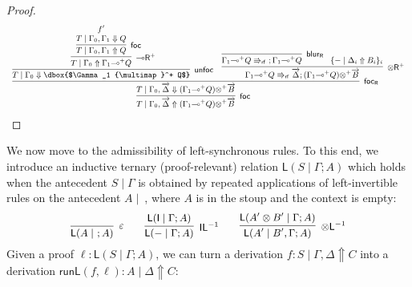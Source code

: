 \documentclass[runningheads]{llncs}
\renewcommand{\vec}{\overrightarrow}
\newcommand{\tl}{\otimes \mathsf{L}}
\newcommand{\tr}{\otimes \mathsf{R}}
\newcommand{\lright}{{\multimap}\mathsf{R}}
\newcommand{\pass}{\mathsf{pass}}
\newcommand{\unitl}{\mathsf{IL}}
\newcommand{\otL}{\tl}
\newcommand{\otR}{\tr}
\newcommand{\lolliR}{\lright}
\newcommand{\IL}{\unitl}
\newcommand{\ot}{\otimes}
\newcommand{\lolli}{\multimap}
\newcommand{\I}{\mathsf{I}}
\renewcommand{\L}{\mathsf{L}}
\newcommand{\rf}{\Rrightarrow_\mathsf{rf}}
\newcommand{\proofbox}[1]{\begin{tabular}{l} #1 \end{tabular}}
\newcommand{\up}{\Uparrow}
\newcommand{\dn}{\Downarrow}
\newcommand{\foc}{\mathsf{foc}}
\newcommand{\focR}{\mathsf{foc_R}}
\newcommand{\blurR}{\mathsf{blur_R}}
\newcommand{\unfoc}{\mathsf{unfoc}}
\newcommand{\runL}{\mathsf{runL}}
\begin{document}
\begin{proof}
  \begin{equation}\label{eq:otR+foc}
    \footnotesize
    \proofbox{
  \infer[\foc]{T \mid \Gamma_0 , \vec{\Delta} \up (\Gamma_1 {\lolli}^+ Q) {\ot}^+ \vec{B}}{
    \infer[\focR]{T \mid \Gamma_0 , \vec{\Delta} \dn (\Gamma_1 {\lolli}^+ Q) {\ot}^+ \vec{B}}{
      \infer[\unfoc]{T \mid \Gamma_0 \dn \dbox{$\Gamma_1 {\lolli}^+ Q$}}{
        \infer[\lolliR^+]{T \mid \Gamma_0 \up \Gamma_1 {\lolli}^+ Q}{
          \infer[\foc]{T \mid \Gamma_0 , \Gamma_1 \up Q}{
            \deduce{T \mid \Gamma_0 , \Gamma_1 \dn Q}{f'}
          }
        }
      }
      &
      \infer[\otR^+]{\Gamma_1 {\lolli}^+ Q \rf \vec{\Delta};(\Gamma_1 {\lolli}^+ Q) {\ot}^+ \vec{B}}{
        \infer[\blurR]{\Gamma_1 {\lolli}^+ Q \rf ~ ; \Gamma_1 {\lolli}^+ Q}{}
        &
        \! \{ - \mid \Delta_i \up B_i \}_{i}
      }
    }
  }
  }
  \end{equation}
\end{proof}
We now move to the admissibility of left-synchronous rules. To this end, we introduce an inductive ternary (proof-relevant) relation $\L(S\mid\Gamma;A)$ which holds when the antecedent $S\mid \Gamma$ is obtained by repeated applications of left-invertible rules on the antecedent $A \mid ~$, where $A$ is in the stoup and the context is empty:
\begin{equation*}\small
  \infer[\varepsilon]{\L(A\mid ~ ;A)}{}
  \qquad
  \infer[\IL^{-1}]{\L(-\mid\Gamma;A)}{\L(\I\mid\Gamma;A)}
  \qquad
  \infer[\otL^{-1}]{\L(A'\mid B',\Gamma;A)}{\L(A' \ot B'\mid \Gamma;A)}
\end{equation*}
Given a proof $\ell : \L(S\mid\Gamma;A)$, we can turn a derivation $f : S \mid \Gamma,\Delta \up C$ into a derivation $\runL(f,\ell) : A \mid \Delta \up C$:
\end{document}
